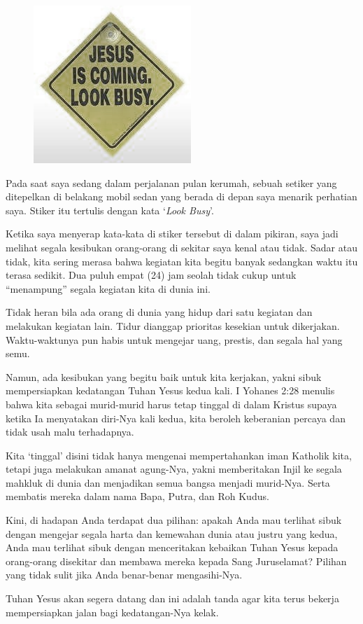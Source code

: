 
\begin{figure}
\includegraphics[scale=0.35]{gambar/look-busy.png}
\end{figure} 

Pada saat saya sedang dalam perjalanan pulan kerumah, sebuah setiker yang ditepelkan di belakang mobil sedan yang berada di depan saya menarik perhatian saya. Stiker itu tertulis dengan kata `\textit{Look Busy}'.

Ketika saya menyerap kata-kata di stiker tersebut di dalam pikiran, saya jadi melihat segala kesibukan orang-orang di sekitar saya kenal atau tidak. Sadar atau tidak, kita sering merasa bahwa kegiatan kita begitu banyak sedangkan waktu itu terasa sedikit. Dua puluh empat (24) jam seolah tidak cukup untuk ``menampung'' segala kegiatan kita di dunia ini.

Tidak heran bila ada orang di dunia yang hidup dari satu kegiatan dan melakukan kegiatan lain. Tidur dianggap prioritas kesekian untuk dikerjakan. Waktu-waktunya pun habis untuk mengejar uang, prestis, dan segala hal yang semu.

Namun, ada kesibukan yang begitu baik untuk kita kerjakan, yakni sibuk mempersiapkan kedatangan Tuhan Yesus kedua kali. I Yohanes 2:28 menulis bahwa kita sebagai murid-murid harus tetap  tinggal di dalam Kristus supaya ketika Ia menyatakan diri-Nya kali kedua, kita beroleh keberanian percaya dan tidak usah malu terhadapnya.

Kita `tinggal' disini tidak hanya mengenai mempertahankan iman Katholik kita, tetapi juga melakukan amanat agung-Nya, yakni memberitakan Injil ke segala mahkluk di dunia dan menjadikan semua bangsa menjadi murid-Nya. Serta membatis mereka dalam nama Bapa, Putra, dan Roh Kudus.

Kini, di hadapan Anda terdapat dua pilihan: apakah Anda mau terlihat sibuk dengan mengejar segala harta dan kemewahan dunia atau justru yang kedua, Anda mau terlihat sibuk dengan menceritakan kebaikan Tuhan Yesus kepada orang-orang disekitar dan membawa mereka kepada Sang Juruselamat? Pilihan yang tidak sulit jika Anda benar-benar mengasihi-Nya.

Tuhan Yesus akan segera datang dan ini adalah tanda agar kita terus bekerja mempersiapkan jalan bagi kedatangan-Nya kelak.

\normalsize